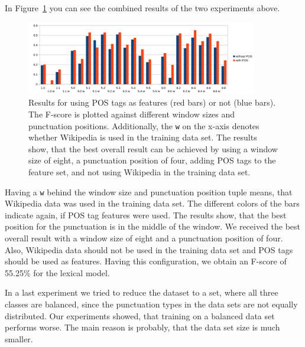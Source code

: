 In Figure~\ref{fig:window_eval} you can see the combined results of the two experiments above.
\begin{figure}[ht]
    \centering
    \includegraphics[width=0.9\textwidth]{img/window_eval.png}
    \caption{Results for using POS tags as features (red bars) or not (blue bars). The F-score is plotted against different window sizes and punctuation positions. Additionally, the \texttt{w} on the x-axis denotes whether Wikipedia is used in the training data set. The results show, that the best overall result can be achieved by using a window size of eight, a punctuation position of four, adding POS tags to the feature set, and not using Wikipedia in the training data set.}
    \label{fig:window_eval}
\end{figure}
Having a \texttt{w} behind the window size and punctuation position tuple means, that Wikipedia data was used in the training data set.
The different colors of the bars indicate again, if POS tag features were used.
The results show, that the best position for the punctuation is in the middle of the window.
We received the best overall result with a window size of eight and a punctuation position of four.
Also, Wikipedia data should not be used in the training data set and POS tags should be used as features.
Having this configuration, we obtain an F-score of 55.25\% for the lexical model.

In a last experiment we tried to reduce the dataset to a set, where all three classes are balanced, since the punctuation types in the data sets are not equally distributed.
Our experiments showed, that training on a balanced data set performs worse.
The main reason is probably, that the data set size is much smaller.